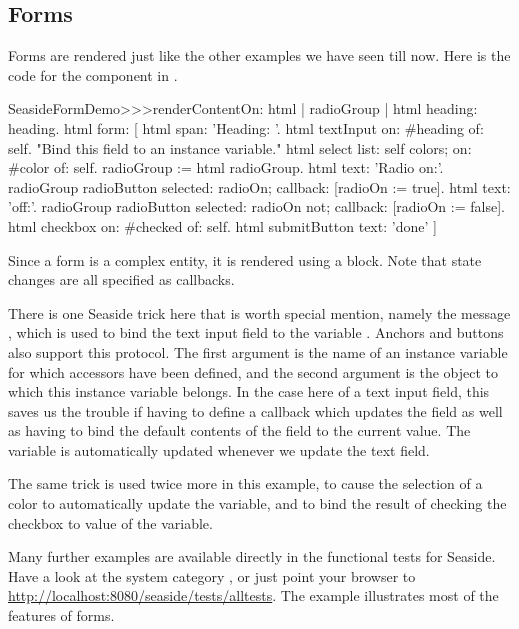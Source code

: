\documentclass[a4paper,10pt,twoside]{book}
\begin{document}

\subsection{Forms}

Forms are rendered just like the other examples we have seen till now.
Here is the code for the  component in .

\begin{code}{}
SeasideFormDemo>>>renderContentOn: html
	| radioGroup |
	html heading: heading.
	html form: [
		html span: 'Heading: '.
		html textInput on: #heading of: self. "Bind this field to an instance variable."
		html select
			list: self colors;
			on: #color of: self.
		radioGroup := html radioGroup.
		html text: 'Radio on:'.
		radioGroup radioButton
			selected: radioOn;
			callback: [radioOn := true].
		html text: 'off:'.
		radioGroup radioButton
			selected: radioOn not;
			callback: [radioOn := false].
		html checkbox on: #checked of: self.
		html submitButton
			text: 'done'
		]
\end{code}{}

Since a form is a complex entity, it is rendered using a block.
Note that state changes are all specified as callbacks.

There is one Seaside trick here that is worth special mention, namely the message , which is used to bind the text input field to the variable .
Anchors and buttons also support this protocol.
The first argument is the name of an instance variable for which accessors have been defined, and the second argument is the object to which this instance variable belongs.
In the case here of a text input field, this saves us the trouble if having to define a callback which updates the field as well as having to bind the default contents of the field to the current value.
The  variable is automatically updated whenever we update the text field.

The same trick is used twice more in this example, to cause the selection of a color to automatically update the  variable, and to bind the result of checking the checkbox to value of the  variable.

Many further examples are available directly in the functional tests for Seaside.
Have a look at the system category , or just point your browser to \url{http://localhost:8080/seaside/tests/alltests}.
The  example illustrates most of the features of forms.
\end{document}
